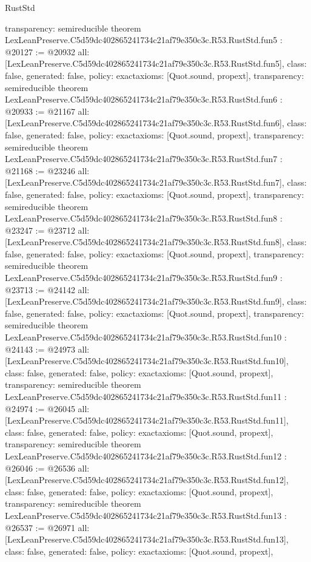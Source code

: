 \begin{lexlean}{RustStd}
\begin{coremodule}
{  transparency: semireducible
}
theorem LexLeanPreserve.C5d59dc402865241734c21af79e350c3c.R53.RustStd.fun5 : @20127 := @20932 {
  all: [LexLeanPreserve.C5d59dc402865241734c21af79e350c3c.R53.RustStd.fun5],
  class: false,
  generated: false,
  policy: exact{axioms: [Quot.sound, propext]},
  transparency: semireducible
}
theorem LexLeanPreserve.C5d59dc402865241734c21af79e350c3c.R53.RustStd.fun6 : @20933 := @21167 {
  all: [LexLeanPreserve.C5d59dc402865241734c21af79e350c3c.R53.RustStd.fun6],
  class: false,
  generated: false,
  policy: exact{axioms: [Quot.sound, propext]},
  transparency: semireducible
}
theorem LexLeanPreserve.C5d59dc402865241734c21af79e350c3c.R53.RustStd.fun7 : @21168 := @23246 {
  all: [LexLeanPreserve.C5d59dc402865241734c21af79e350c3c.R53.RustStd.fun7],
  class: false,
  generated: false,
  policy: exact{axioms: [Quot.sound, propext]},
  transparency: semireducible
}
theorem LexLeanPreserve.C5d59dc402865241734c21af79e350c3c.R53.RustStd.fun8 : @23247 := @23712 {
  all: [LexLeanPreserve.C5d59dc402865241734c21af79e350c3c.R53.RustStd.fun8],
  class: false,
  generated: false,
  policy: exact{axioms: [Quot.sound, propext]},
  transparency: semireducible
}
theorem LexLeanPreserve.C5d59dc402865241734c21af79e350c3c.R53.RustStd.fun9 : @23713 := @24142 {
  all: [LexLeanPreserve.C5d59dc402865241734c21af79e350c3c.R53.RustStd.fun9],
  class: false,
  generated: false,
  policy: exact{axioms: [Quot.sound, propext]},
  transparency: semireducible
}
theorem LexLeanPreserve.C5d59dc402865241734c21af79e350c3c.R53.RustStd.fun10 : @24143 := @24973 {
  all: [LexLeanPreserve.C5d59dc402865241734c21af79e350c3c.R53.RustStd.fun10],
  class: false,
  generated: false,
  policy: exact{axioms: [Quot.sound, propext]},
  transparency: semireducible
}
theorem LexLeanPreserve.C5d59dc402865241734c21af79e350c3c.R53.RustStd.fun11 : @24974 := @26045 {
  all: [LexLeanPreserve.C5d59dc402865241734c21af79e350c3c.R53.RustStd.fun11],
  class: false,
  generated: false,
  policy: exact{axioms: [Quot.sound, propext]},
  transparency: semireducible
}
theorem LexLeanPreserve.C5d59dc402865241734c21af79e350c3c.R53.RustStd.fun12 : @26046 := @26536 {
  all: [LexLeanPreserve.C5d59dc402865241734c21af79e350c3c.R53.RustStd.fun12],
  class: false,
  generated: false,
  policy: exact{axioms: [Quot.sound, propext]},
  transparency: semireducible
}
theorem LexLeanPreserve.C5d59dc402865241734c21af79e350c3c.R53.RustStd.fun13 : @26537 := @26971 {
  all: [LexLeanPreserve.C5d59dc402865241734c21af79e350c3c.R53.RustStd.fun13],
  class: false,
  generated: false,
  policy: exact{axioms: [Quot.sound, propext]},
}
\end{coremodule}
\end{lexlean}

